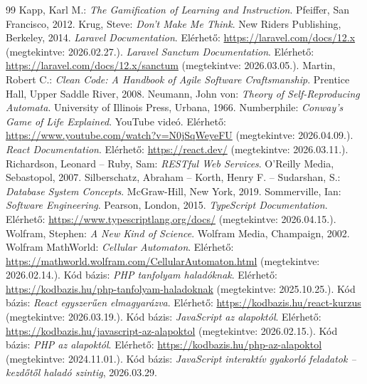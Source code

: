 \documentclass{thesis-ekf}
\begin{document}
\begin{thebibliography}{99}
Kapp, Karl M.: \textit{The Gamification of Learning and Instruction}. Pfeiffer, San Francisco, 2012.
Krug, Steve: \textit{Don't Make Me Think}. New Riders Publishing, Berkeley, 2014.
\textit{Laravel Documentation}. Elérhető: \url{https://laravel.com/docs/12.x} (megtekintve: 2026.02.27.).
\textit{Laravel Sanctum Documentation}. Elérhető: \url{https://laravel.com/docs/12.x/sanctum} (megtekintve: 2026.03.05.).
Martin, Robert C.: \textit{Clean Code: A Handbook of Agile Software Craftsmanship}. Prentice Hall, Upper Saddle River, 2008.
Neumann, John von: \textit{Theory of Self-Reproducing Automata}. University of Illinois Press, Urbana, 1966.
Numberphile: \textit{Conway's Game of Life Explained}. YouTube videó. Elérhető: \url{https://www.youtube.com/watch?v=N0jSqWeyeFU} (megtekintve: 2026.04.09.).
\textit{React Documentation}. Elérhető: \url{https://react.dev/} (megtekintve: 2026.03.11.).
Richardson, Leonard -- Ruby, Sam: \textit{RESTful Web Services}. O'Reilly Media, Sebastopol, 2007.
Silberschatz, Abraham -- Korth, Henry F. -- Sudarshan, S.: \textit{Database System Concepts}. McGraw-Hill, New York, 2019.
Sommerville, Ian: \textit{Software Engineering}. Pearson, London, 2015.
\textit{TypeScript Documentation}. Elérhető: \url{https://www.typescriptlang.org/docs/} (megtekintve: 2026.04.15.).
Wolfram, Stephen: \textit{A New Kind of Science}. Wolfram Media, Champaign, 2002.
Wolfram MathWorld: \textit{Cellular Automaton}. Elérhető: \url{https://mathworld.wolfram.com/CellularAutomaton.html} (megtekintve: 2026.02.14.).
Kód bázis: \textit{PHP tanfolyam haladóknak}. Elérhető: \url{https://kodbazis.hu/php-tanfolyam-haladoknak} (megtekintve: 2025.10.25.).
Kód bázis: \textit{React egyszerűen elmagyarázva}. Elérhető: \url{https://kodbazis.hu/react-kurzus} (megtekintve: 2026.03.19.).
Kód bázis: \textit{JavaScript az alapoktól}. Elérhető: \url{https://kodbazis.hu/javascript-az-alapoktol} (megtekintve: 2026.02.15.).
Kód bázis: \textit{PHP az alapoktól}. Elérhető: \url{https://kodbazis.hu/php-az-alapoktol} (megtekintve: 2024.11.01.).
Kód bázis: \textit{JavaScript interaktív gyakorló feladatok -- kezdőtől haladó szintig}, 2026.03.29.

\end{thebibliography}
\end{document}
